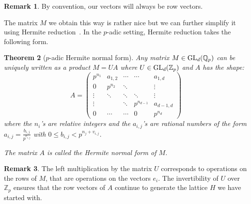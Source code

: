 \documentclass[11pt]{article}
\numberwithin{equation}{section}
\numberwithin{figure}{section}
\renewcommand{\leq}{\leqslant}
\newtheorem{theo}{Theorem}[section]
\theoremstyle{definition}
\newtheorem{rem}[theo]{Remark}
\newcommand{\Z}{\mathbb Z}
\newcommand{\Zp}{\Z_p}
\newcommand{\Q}{\mathbb Q}
\newcommand{\Qp}{\Q_p}
\newcommand{\GL}{\text{\rm GL}}
\begin{document}
\begin{rem}
By convention, our vectors will always be row vectors.
\end{rem}

\noindent
The matrix $M$ we obtain this way is rather nice but we can further 
simplify it using Hermite reduction~\cite[\S 2.4]{Co93}. 
In the $p$-adic setting, Hermite reduction takes the following form.

\begin{theo}[$p$-adic Hermite normal form]
\label{theo:hermitered}
Any matrix $M \in \GL_d(\Qp)$ can be uniquely written as a product
$M = U A$ where $U \in \GL_d(\Zp)$ and $A$ has the shape:
$$A = \left(\begin{matrix}
p^{n_1} & a_{1,2} & \cdots & \cdots & a_{1,d} \\
0 & p^{n_2} & \ddots & & \vdots \\
\vdots & \ddots & \ddots & \ddots & \vdots \\
\vdots & & \ddots & p^{n_{d-1}} & a_{d-1,d} \\
0 & \cdots & \cdots & 0 & p^{n_d} 
\end{matrix} \right)$$
where the $n_i$'s are relative integers and the $a_{i,j}$'s are 
rational numbers of the form $a_{i,j} = \frac {b_{i,j}}{p^{v_{i,j}}}$
with $0 \leq b_{i,j} < p^{n_j + v_{i,j}}$.

The matrix $A$ is called the \emph{Hermite normal form} of $M$.
\end{theo}

\begin{rem}
The left multiplication by the matrix $U$ corresponds to operations on
the rows of $M$, that are operations on the vectors $e_i$.
The invertibility of $U$ over $\Zp$ ensures that the row vectors of
$A$ continue to generate the lattice $H$ we have started with.
\end{rem}
\end{document}
